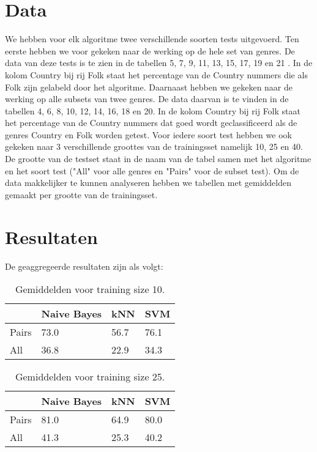 \documentclass[a4paper,oneside]{article}
\begin{document}
\section{Data}
We hebben voor elk algoritme twee verschillende soorten tests uitgevoerd. Ten eerste hebben we voor gekeken naar de werking op de hele set van genres. De data van deze tests is te zien in de tabellen 5, 7, 9, 11, 13, 15, 17, 19 en 21 . In de kolom Country bij rij Folk staat het percentage van de Country nummers die als Folk zijn gelabeld door het algoritme. Daarnaast hebben we gekeken naar de werking  op alle subsets van twee genres. De data daarvan is te vinden in de tabellen 4, 6, 8, 10, 12, 14, 16, 18 en 20. In de kolom Country bij rij Folk staat het percentage van de Country nummers dat goed wordt geclassificeerd als de genres Country en Folk worden getest. Voor iedere soort test hebben we ook gekeken naar 3 verschillende groottes van de trainingsset namelijk 10, 25 en 40. De grootte van de testset staat in de naam van de tabel samen met het algoritme en het soort test ("All" voor alle genres en "Pairs" voor de subset test). Om de data makkelijker te kunnen analyseren hebben we tabellen met gemiddelden gemaakt per grootte van de trainingsset.

\section{Resultaten}
De geaggregeerde resultaten zijn als volgt:

\begin{table}[H]\centering
\caption{Gemiddelden voor training size 10.}
\begin{tabu}{l|l|l|l}
& Naive Bayes & kNN & SVM \\ \hline
Pairs & 73.0 & 56.7 & 76.1 \\
All & 36.8 & 22.9 & 34.3 \\
\end{tabu}
\end{table}

\begin{table}[H]\centering
\caption{Gemiddelden voor training size 25.}
\begin{tabu}{l|l|l|l}
& Naive Bayes & kNN & SVM \\ \hline
Pairs & 81.0 & 64.9 & 80.0 \\
All & 41.3 & 25.3 & 40.2 \\
\end{tabu}
\end{table}
\end{document}
